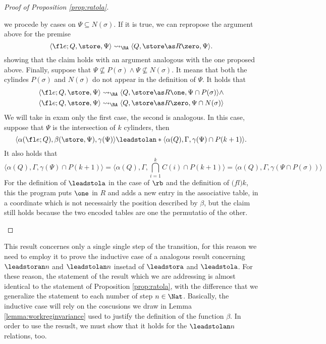 \begin{proof}[Proof of Proposition \ref{prop:ratola}]
\begin{itemize}
     we procede by cases on $\Psi \subseteq N(\sigma)$. If it is true,
     we can repropose the argument above for the premise
     $$
     \langle \fl e;Q, \store, \Psi\rangle \leadsto_\RA \langle Q, \store\as R \zero, \Psi\rangle.
     $$
     showing that the claim holds with an argument analogous with the one proposed above.
     Finally, suppose that $\Psi \not \subseteq P(\sigma)\land \Psi \not \subseteq N(\sigma)$.
     It means that both the cylindes $P(\sigma)$ and $N(\sigma)$ do not appear
     in the definition of $\Psi$. It holds that
     \begin{align*}
     &\langle \fl e;Q, \store, \Psi\rangle \leadsto_\RA \langle Q, \store\as R \one, \Psi\cap P(\sigma)\rangle \land\\
     &\langle \fl e;Q, \store, \Psi\rangle \leadsto_\RA \langle Q, \store\as R \zero, \Psi\cap N(\sigma)\rangle
     \end{align*}
     We will take in exam only the first case, the second is analogous.
     In this case, suppose that $\Psi$ is the intersection of $k$ cylinders, then
     $$
     \langle \alpha(\fl e;Q), \beta(\store, \Psi), \gamma(\Psi)\rangle \leadstolan * \langle \alpha(Q), \Gamma, \gamma(\Psi)\cap P(k+1)\rangle.
     $$
     It also holds that
     $$
     \langle \alpha(Q), \Gamma, \gamma(\Psi)\cap P(k+1)\rangle=\langle \alpha(Q), \Gamma, \bigcap_{i=1}^k C(i)\cap P(k+1)\rangle = \langle \alpha(Q), \Gamma, \gamma(\Psi \cap P(\sigma))\rangle
     $$
     For the definition of $\leadstola$ in the case of $\rb$ and
     the definition of $\mathit(fl) k$, this the program puts $\one$ in $R$ and
     adds a new entry in
     the associative table, in a coordinate which is not necessairly the
     position described by $\beta$, but the claim still holds because
     the two encoded tables are one the permutatio of the other.
  \end{itemize}
\end{proof}

This result concernes only a single single step of the transition, for this
reason we need to employ it to prove the inductive case of a analogous result
concerning $\leadstoran n$ and $\leadstolan n$ insetad of $\leadstora$ and
$\leadstola$. For these reason, the statement of the result which we are addressing
is almost identical to the statement of Proposition \ref{prop:ratola},
with the difference that we generalize the statement to each number of step $n \in \Nat$.
%
Basically, the inductive case will rely on the coscusions we draw in Lemma
\ref{lemma:workreginvariance} used to justify the definition of the function
$\beta$. In order to use the resuslt, we must
show that it holds for the $\leadstolan n$ relations, too.

